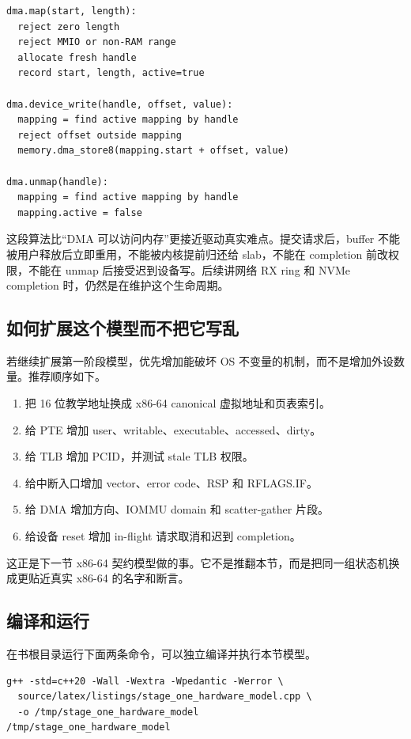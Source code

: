 \begin{lstlisting}
dma.map(start, length):
  reject zero length
  reject MMIO or non-RAM range
  allocate fresh handle
  record start, length, active=true

dma.device_write(handle, offset, value):
  mapping = find active mapping by handle
  reject offset outside mapping
  memory.dma_store8(mapping.start + offset, value)

dma.unmap(handle):
  mapping = find active mapping by handle
  mapping.active = false
\end{lstlisting}

这段算法比“DMA 可以访问内存”更接近驱动真实难点。提交请求后，buffer 不能被用户释放后立即重用，不能被内核提前归还给 slab，不能在 completion 前改权限，不能在 unmap 后接受迟到设备写。后续讲网络 RX ring 和 NVMe completion 时，仍然是在维护这个生命周期。

\subsection{如何扩展这个模型而不把它写乱}

若继续扩展第一阶段模型，优先增加能破坏 OS 不变量的机制，而不是增加外设数量。推荐顺序如下。

\begin{enumerate}
\tightlist
\item 把 16 位教学地址换成 x86-64 canonical 虚拟地址和页表索引。
\item 给 PTE 增加 user、writable、executable、accessed、dirty。
\item 给 TLB 增加 PCID，并测试 stale TLB 权限。
\item 给中断入口增加 vector、error code、RSP 和 RFLAGS.IF。
\item 给 DMA 增加方向、IOMMU domain 和 scatter-gather 片段。
\item 给设备 reset 增加 in-flight 请求取消和迟到 completion。
\end{enumerate}

这正是下一节 x86-64 契约模型做的事。它不是推翻本节，而是把同一组状态机换成更贴近真实 x86-64 的名字和断言。

\subsection{编译和运行}

在书根目录运行下面两条命令，可以独立编译并执行本节模型。

\begin{lstlisting}
g++ -std=c++20 -Wall -Wextra -Wpedantic -Werror \
  source/latex/listings/stage_one_hardware_model.cpp \
  -o /tmp/stage_one_hardware_model
/tmp/stage_one_hardware_model
\end{lstlisting}

